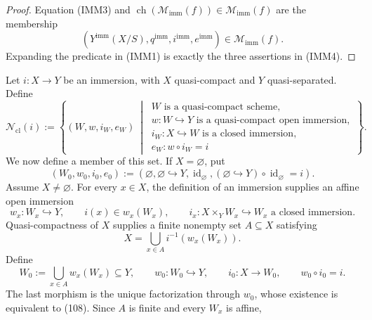 \begin{proof}
  Equation (IMM3) and
  \(\operatorname{ch}(\mathscr M_{\mathrm{imm}}(f))
    \in\mathscr M_{\mathrm{imm}}(f)\)
  are the membership
  \[
    (Y^{\mathrm{imm}}(X/S),q^{\mathrm{imm}},
      i^{\mathrm{imm}},e^{\mathrm{imm}})
      \in\mathscr M_{\mathrm{imm}}(f).
  \]
  Expanding the predicate in (IMM1) is exactly the three assertions in (IMM4).
\end{proof}
\begin{definition}
  \label{def:nagata-immersion-shrink-to-closed}
  \lean{}

  Let \(i\colon X\to Y\) be an immersion, with \(X\) quasi-compact and
  \(Y\) quasi-separated.  Define
  \[
    \mathscr N_{\mathrm{cl}}(i):=
      \left\{(W,w,i_W,e_W)\ \middle|\
      \begin{array}{l}
        W\text{ is a quasi-compact scheme},\\
        w\colon W\hookrightarrow Y\text{ is a quasi-compact open immersion},\\
        i_W\colon X\hookrightarrow W\text{ is a closed immersion},\\
        e_W\colon w\circ i_W=i
      \end{array}\right\}.                                        \tag{105}
  \]
  We now define a member of this set.  If \(X=\varnothing\), put
  \[
    (W_0,w_0,i_0,e_0):=
      (\varnothing,\varnothing\hookrightarrow Y,
        \operatorname{id}_{\varnothing},
        (\varnothing\hookrightarrow Y)\circ
          \operatorname{id}_{\varnothing}=i).                     \tag{106}
  \]
  Assume \(X\neq\varnothing\).  For every \(x\in X\), the definition of an
  immersion supplies an affine open immersion
  \[
    w_x\colon W_x\hookrightarrow Y,\qquad i(x)\in w_x(W_x),
    \qquad
    i_x\colon X\times_YW_x\hookrightarrow W_x
      \text{ a closed immersion}.                                 \tag{107}
  \]
  Quasi-compactness of \(X\) supplies a finite nonempty set \(A\subseteq X\)
  satisfying
  \[
    X=\bigcup_{x\in A}i^{-1}(w_x(W_x)).                            \tag{108}
  \]
  Define
  \[
    W_0:=\bigcup_{x\in A}w_x(W_x)\subseteq Y,\qquad
    w_0\colon W_0\hookrightarrow Y,\qquad
    i_0\colon X\to W_0,\qquad
    w_0\circ i_0=i.                                                \tag{109}
  \]
  The last morphism is the unique factorization through \(w_0\), whose
  existence is equivalent to (108).  Since \(A\) is finite and every \(W_x\)
  is affine,

\end{definition}

